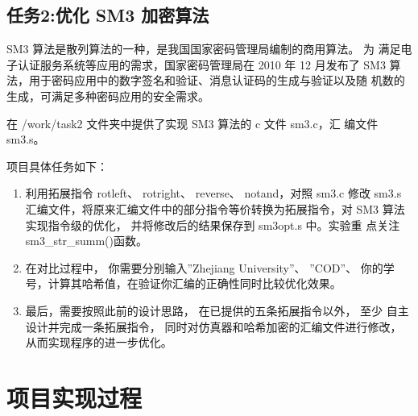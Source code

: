 \documentclass[12pt,hyperref,a4paper,UTF8]{ctexart}
\begin{document}
\subsection*{任务2:优化 SM3 加密算法}
SM3 算法是散列算法的一种，是我国国家密码管理局编制的商用算法。 为
满足电子认证服务系统等应用的需求，国家密码管理局在 2010 年 12 月发布了
SM3 算法，用于密码应用中的数字签名和验证、消息认证码的生成与验证以及随
机数的生成，可满足多种密码应用的安全需求。

在 /work/task2 文件夹中提供了实现 SM3 算法的 c 文件 sm3.c，汇
编文件 sm3.s。

项目具体任务如下：


\begin{enumerate}
    \item 利用拓展指令 rotleft、 rotright、 reverse、 notand，对照 sm3.c 
修改 sm3.s 汇编文件，将原来汇编文件中的部分指令等价转换为拓展指令，对
SM3 算法实现指令级的优化， 并将修改后的结果保存到 sm3opt.s 中。实验重
点关注 sm3\_str\_summ()函数。
    \item 在对比过程中， 你需要分别输入”Zhejiang University”、 ”COD”、 你的学
号，计算其哈希值，在验证你汇编的正确性同时比较优化效果。
    \item 最后，需要按照此前的设计思路， 在已提供的五条拓展指令以外， 至少
自主设计并完成一条拓展指令， 同时对仿真器和哈希加密的汇编文件进行修改，
从而实现程序的进一步优化。
\end{enumerate}




\section{项目实现过程}
\end{document}
